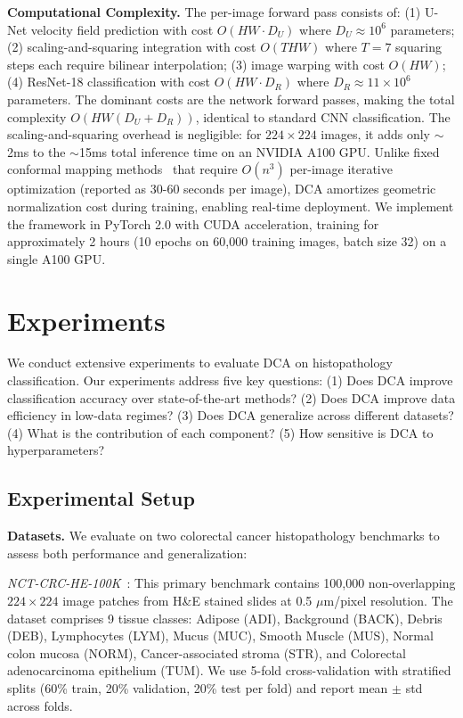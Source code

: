 \documentclass[10pt,journal,compsoc]{IEEEtran}
\begin{document}
\textbf{Computational Complexity.} The per-image forward pass consists of: (1) U-Net velocity field prediction with cost $O(HW \cdot D_U)$ where $D_U \approx 10^6$ parameters; (2) scaling-and-squaring integration with cost $O(THW)$ where $T=7$ squaring steps each require bilinear interpolation; (3) image warping with cost $O(HW)$; (4) ResNet-18 classification with cost $O(HW \cdot D_R)$ where $D_R \approx 11 \times 10^6$ parameters. The dominant costs are the network forward passes, making the total complexity $O(HW(D_U + D_R))$, identical to standard CNN classification. The scaling-and-squaring overhead is negligible: for $224 \times 224$ images, it adds only $\sim$2ms to the $\sim$15ms total inference time on an NVIDIA A100 GPU. Unlike fixed conformal mapping methods~\cite{huang2024surface} that require $O(n^3)$ per-image iterative optimization (reported as 30-60 seconds per image), DCA amortizes geometric normalization cost during training, enabling real-time deployment. We implement the framework in PyTorch 2.0 with CUDA acceleration, training for approximately 2 hours (10 epochs on 60,000 training images, batch size 32) on a single A100 GPU.

\section{Experiments}
\label{sec:experiments}

We conduct extensive experiments to evaluate DCA on histopathology classification. Our experiments address five key questions: (1) Does DCA improve classification accuracy over state-of-the-art methods? (2) Does DCA improve data efficiency in low-data regimes? (3) Does DCA generalize across different datasets? (4) What is the contribution of each component? (5) How sensitive is DCA to hyperparameters?

\subsection{Experimental Setup}

\textbf{Datasets.} We evaluate on two colorectal cancer histopathology benchmarks to assess both performance and generalization:

\textit{NCT-CRC-HE-100K}~\cite{nct_dataset}: This primary benchmark contains 100,000 non-overlapping $224 \times 224$ image patches from H\&E stained slides at 0.5 $\mu$m/pixel resolution. The dataset comprises 9 tissue classes: Adipose (ADI), Background (BACK), Debris (DEB), Lymphocytes (LYM), Mucus (MUC), Smooth Muscle (MUS), Normal colon mucosa (NORM), Cancer-associated stroma (STR), and Colorectal adenocarcinoma epithelium (TUM). We use 5-fold cross-validation with stratified splits (60\% train, 20\% validation, 20\% test per fold) and report mean $\pm$ std across folds.
\end{document}
